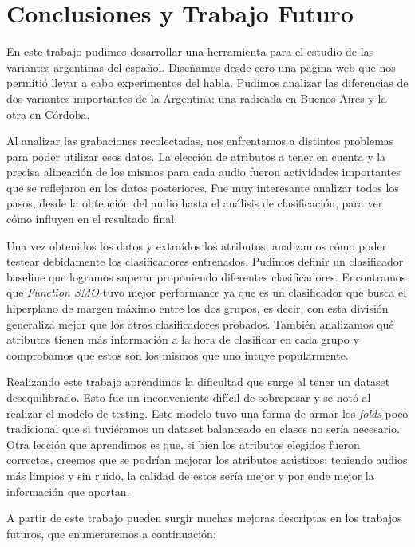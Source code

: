 \chapter{Conclusiones y Trabajo Futuro}

En este trabajo pudimos desarrollar una herramienta para el estudio de las variantes argentinas del español. Diseñamos desde cero una página web que nos permitió llevar a cabo experimentos del habla. Pudimos analizar las diferencias de dos variantes importantes de la Argentina: una radicada en Buenos Aires y la otra en Córdoba. 

Al analizar las grabaciones recolectadas, nos enfrentamos a distintos problemas para poder utilizar esos datos. La elección de atributos a tener en cuenta y la precisa alineación de los mismos para cada audio fueron actividades importantes que se reflejaron en los datos posteriores. Fue muy interesante analizar todos los pasos, desde la obtención del audio hasta el análisis de clasificación, para ver cómo influyen en el resultado final.

Una vez obtenidos los datos y extraídos los atributos, analizamos cómo poder testear debidamente los clasificadores entrenados. Pudimos definir un clasificador baseline que logramos superar proponiendo diferentes clasificadores. Encontramos que \textit{Function SMO} tuvo mejor performance ya que es un clasificador que busca el hiperplano de margen máximo entre los dos grupos, es decir, con esta división generaliza mejor que los otros clasificadores probados. También analizamos qué atributos tienen más información a la hora de clasificar en cada grupo y comprobamos que estos son los mismos que uno intuye popularmente.

Realizando este trabajo aprendimos la dificultad que surge al tener un dataset desequilibrado. Esto fue un inconveniente difícil de sobrepasar y se notó al realizar el modelo de testing. Este modelo tuvo una forma de armar los \textit{folds} poco tradicional que si tuviéramos un dataset balanceado en clases  no sería necesario. Otra lección que aprendimos es que, si bien los atributos elegidos fueron correctos, creemos que se podrían mejorar los atributos acústicos; teniendo audios más limpios y sin ruido, la calidad de estos sería mejor y por ende mejor la información que aportan. 

A partir de este trabajo pueden surgir muchas mejoras descriptas en los trabajos futuros, que enumeraremos a continuación:

